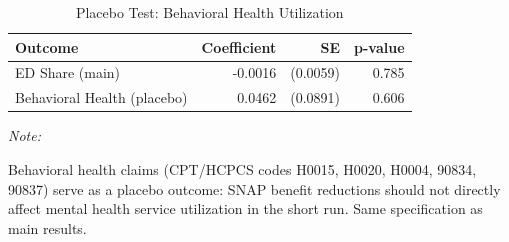 \begin{table}[!h]
\centering
\caption{Placebo Test: Behavioral Health Utilization}
\centering
\begin{threeparttable}
\begin{tabular}[t]{lrrr}
\toprule
Outcome & Coefficient & SE & p-value\\
\midrule
ED Share (main) & -0.0016 & (0.0059) & 0.785\\
Behavioral Health (placebo) & 0.0462 & (0.0891) & 0.606\\
\bottomrule
\end{tabular}
\begin{tablenotes}
\item \textit{Note: } 
\item Behavioral health claims (CPT/HCPCS codes H0015, H0020, H0004, 90834, 90837) serve as a placebo outcome: SNAP benefit reductions should not directly affect mental health service utilization in the short run. Same specification as main results.
\end{tablenotes}
\end{threeparttable}
\end{table}
